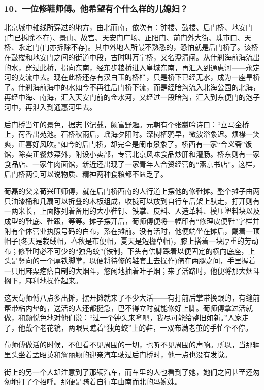 \subsubsection*{10．一位修鞋师傅。他希望有个什么样的儿媳妇？}
\par 北京城中轴线所穿过的地方，由北而南，依次有：钟楼、鼓楼、后门桥、地安门(门已拆除不存)、景山、故宫、天安门广场、正阳门、前门外大街、珠市口、天桥、永定门(门亦拆除不存)。其中外地人所最不熟悉的，恐怕就是后门桥了。该桥在鼓楼和地安门之间的街道中段，古时叫万宁桥，又名澄清闸。从什刹海前海流出的水，穿过此桥，拐向东南，经东步粮桥进入皇城东南，再汇入到通惠河——永定河的支流中去。现在此桥还存有汉白玉的桥栏，只是桥下已经无水，成为一座旱桥了。什刹海前海中的水如今不再往后门桥下流，而是经暗沟流入北海公园的北海，再经中海、南海，汇入天安门前的金水河，又经过一段暗沟，汇入到东便门的泡子河中，再泄入到通惠河里去。
\par 后门桥当年的景色，据志书记载，颇富野趣。元朝有个张翥吟诗曰：“立马金桥上，荷香出苑池。石桥秋雨后，瑶海夕阳时。深树栖鸦早，微波浴象迟。烦襟一笑爽，正喜好风吹。”如今的后门桥，却完全是闹市景象了。桥西有一家“合义斋”饭馆，除卖正餐炒菜外，附设小卖部，专营北京风味食品炒肝和灌肠。桥东则有一家食品店、一家牛肉面馆，新近还出现了一家青年人合资经营的“燕京书店”。这样，后门桥两侧可以说物质、精神两种食粮都不匮乏了。
\par 荀磊的父亲荀兴旺师傅，就在后门桥西南的人行道上摆他的修鞋摊。整个摊子由两只油漆桶和几扇可以折叠的木板组成，收拢可以放到自行车后架上驮走，打开则有一两米长，上面陈列着备用的大小鞋钉、铁掌、皮料、人造革料、模压塑料块以及成型的鞋底、鞋跟，等等。摊子摆开后，荀师傅便将一幅印有“修理皮便鞋”字样并附有个体营业执照号码的白布，系在摊前。没有活时，他便端坐在摊后，戴着一顶帽子(冬天是栽绒帽，春秋是布便帽，夏天是短檐草帽)，膝上搭着一块厚重的劳动布；修鞋时必不可少的“独角蛟”(铁制，下头有供脚踩着以便固定的横向底座，上头是竖向的一个厚铁脚掌，以便将待修的鞋套上去操作)倚在两腿之间，手里握着一只用麻栗疙瘩自制的大烟斗，悠闲地抽着叶子烟；来了活路时，他便将那大烟斗搁下，麻利地操作起来。
\par 这天荀师傅八点多出摊，摆开摊就来了不少大活——有打前后掌带换跟的，有缝前帮带粘内垫的，送活的人还都挺急，巴不得立时就能修好上脚。荀师傅拿过活就做，和颜悦色地对他们说：“过一个钟头来拿吧，我尽可能给整旧如新。”人家走了，他戴个老花镜，两眼只瞧着“独角蛟”上的鞋，一双布满老茧的手忙个不停。
\par 荀师傅做活的时候，不但看不见周围的一切，也听不见周围的声响。所以，当那辆里头坐着孟昭英和詹丽颖的迎亲汽车驶过后门桥时，他一点也没有发觉。
\par 街上的另一个人却注意到了那辆汽车，而车里的人也看到了她，她们之间甚至还匆匆地打了个招呼。那便是骑着自行车由南而北的冯婉姝。
